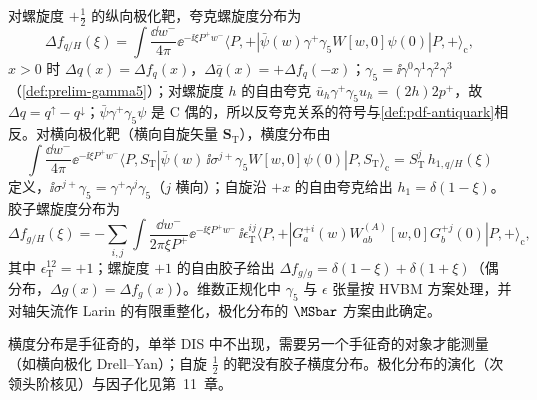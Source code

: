 \begin{definition}[螺旋度与横度分布]\label{def:pdf-polarized}
对螺旋度 $+\frac12$ 的纵向极化靶，夸克螺旋度分布为
\begin{equation}\label{eq:pdf-helicity}
\Delta f_{q/H}(\xi)=\int\frac{\dd w^-}{4\pi}\ee^{-\ii\xi P^+w^-}\langle P,+|\bar\psi(w)\gamma^+\gamma_5W[w,0]\psi(0)|P,+\rangle_{\mathrm c},
\end{equation}
$x>0$ 时 $\Delta q(x)=\Delta f_q(x)$，$\Delta\bar q(x)=+\Delta f_q(-x)$；$\gamma_5=\ii\gamma^0\gamma^1\gamma^2\gamma^3$（\cref{def:prelim-gamma5}）；对螺旋度 $h$ 的自由夸克 $\bar u_h\gamma^+\gamma_5u_h=(2h)2p^+$，故 $\Delta q=q^\uparrow-q^\downarrow$；$\bar\psi\gamma^+\gamma_5\psi$ 是 C 偶的，所以反夸克关系的符号与\cref{def:pdf-antiquark}相反。对横向极化靶（横向自旋矢量 $\bm S_{\mathrm T}$），横度分布由
\begin{equation}\label{eq:pdf-transversity}
\int\frac{\dd w^-}{4\pi}\ee^{-\ii\xi P^+w^-}\langle P,S_{\mathrm T}|\bar\psi(w)\,\ii\sigma^{j+}\gamma_5W[w,0]\psi(0)|P,S_{\mathrm T}\rangle_{\mathrm c}=S_{\mathrm T}^j\,h_{1,q/H}(\xi)
\end{equation}
定义，$\ii\sigma^{j+}\gamma_5=\gamma^+\gamma^j\gamma_5$（$j$ 横向）；自旋沿 $+x$ 的自由夸克给出 $h_1=\delta(1-\xi)$。胶子螺旋度分布为
\begin{equation}\label{eq:pdf-dg}
\Delta f_{g/H}(\xi)=-\sum_{i,j}\int\frac{\dd w^-}{2\pi\xi P^+}\ee^{-\ii\xi P^+w^-}\,\ii\epsilon_{\mathrm T}^{ij}\langle P,+|G^{+i}_a(w)W^{(A)}_{ab}[w,0]G^{+j}_b(0)|P,+\rangle_{\mathrm c},
\end{equation}
其中 $\epsilon_{\mathrm T}^{12}=+1$；螺旋度 $+1$ 的自由胶子给出 $\Delta f_{g/g}=\delta(1-\xi)+\delta(1+\xi)$（偶分布，$\Delta g(x)=\Delta f_g(x)$）。维数正规化中 $\gamma_5$ 与 $\epsilon$ 张量按 HVBM 方案处理，并对轴矢流作 Larin 的有限重整化\cite{Larin:1993tq}，极化分布的 $\MSbar$ 方案由此确定。
\end{definition}

横度分布是手征奇的，单举 DIS 中不出现，需要另一个手征奇的对象才能测量（如横向极化 Drell--Yan\cite{RalstonSoper1979,JaffeJi1991,JaffeJi1992}）；自旋 $\frac12$ 的靶没有胶子横度分布。极化分布的演化（次领头阶核见\cite{MertigVanNeerven1996,Vogelsang1996}）与因子化见第~11~章。

